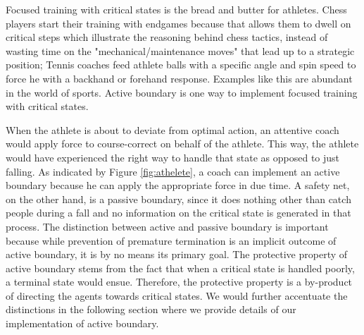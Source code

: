 \documentclass[journal]{IEEEtran}
\begin{document}
Focused training with critical states is the bread and butter for athletes. Chess players start their training with endgames because that allows them to dwell on critical steps which illustrate the reasoning behind chess tactics, instead of wasting time on the "mechanical/maintenance moves" that lead up to a strategic position; Tennis coaches feed athlete balls with a specific angle and spin speed to force he with a backhand or forehand response. Examples like this are abundant in the world of sports. Active boundary is one way to implement focused training with critical states. 

When the athlete is about to deviate from optimal action, an attentive coach would apply force to course-correct on behalf of the athlete. This way, the athlete would have experienced the right way to handle that state as opposed to just falling. As indicated by Figure \ref{fig:athelete}, a coach can implement an active boundary because he can apply the appropriate force in due time. A safety net, on the other hand, is a passive boundary, since it does nothing other than catch people during a fall and no information on the critical state is generated in that process. The distinction between active and passive boundary is important because while prevention of premature termination is an implicit outcome of active boundary, it is by no means its primary goal. The protective property of active boundary stems from the fact that when a critical state is handled poorly, a terminal state would ensue. Therefore, the protective property is a by-product of directing the agents towards critical states. We would further accentuate the distinctions in the following section where we provide details of our implementation of active boundary. 
\end{document}
